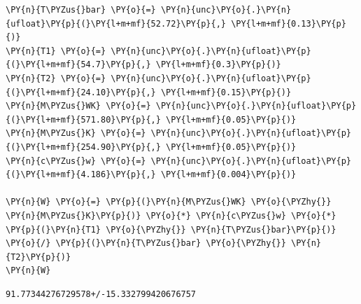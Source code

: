     \begin{tcolorbox}[breakable, size=fbox, boxrule=1pt, pad at break*=1mm,colback=cellbackground, colframe=cellborder]
\begin{Verbatim}[commandchars=\\\{\}]
\PY{n}{T\PYZus{}bar} \PY{o}{=} \PY{n}{unc}\PY{o}{.}\PY{n}{ufloat}\PY{p}{(}\PY{l+m+mf}{52.72}\PY{p}{,} \PY{l+m+mf}{0.13}\PY{p}{)}
\PY{n}{T1} \PY{o}{=} \PY{n}{unc}\PY{o}{.}\PY{n}{ufloat}\PY{p}{(}\PY{l+m+mf}{54.7}\PY{p}{,} \PY{l+m+mf}{0.3}\PY{p}{)}
\PY{n}{T2} \PY{o}{=} \PY{n}{unc}\PY{o}{.}\PY{n}{ufloat}\PY{p}{(}\PY{l+m+mf}{24.10}\PY{p}{,} \PY{l+m+mf}{0.15}\PY{p}{)}
\PY{n}{M\PYZus{}WK} \PY{o}{=} \PY{n}{unc}\PY{o}{.}\PY{n}{ufloat}\PY{p}{(}\PY{l+m+mf}{571.80}\PY{p}{,} \PY{l+m+mf}{0.05}\PY{p}{)}
\PY{n}{M\PYZus{}K} \PY{o}{=} \PY{n}{unc}\PY{o}{.}\PY{n}{ufloat}\PY{p}{(}\PY{l+m+mf}{254.90}\PY{p}{,} \PY{l+m+mf}{0.05}\PY{p}{)}
\PY{n}{c\PYZus{}w} \PY{o}{=} \PY{n}{unc}\PY{o}{.}\PY{n}{ufloat}\PY{p}{(}\PY{l+m+mf}{4.186}\PY{p}{,} \PY{l+m+mf}{0.004}\PY{p}{)}

\PY{n}{W} \PY{o}{=} \PY{p}{(}\PY{n}{M\PYZus{}WK} \PY{o}{\PYZhy{}} \PY{n}{M\PYZus{}K}\PY{p}{)} \PY{o}{*} \PY{n}{c\PYZus{}w} \PY{o}{*} \PY{p}{(}\PY{n}{T1} \PY{o}{\PYZhy{}} \PY{n}{T\PYZus{}bar}\PY{p}{)} \PY{o}{/} \PY{p}{(}\PY{n}{T\PYZus{}bar} \PY{o}{\PYZhy{}} \PY{n}{T2}\PY{p}{)}
\PY{n}{W}
\end{Verbatim}
\end{tcolorbox}

            \begin{tcolorbox}[breakable, size=fbox, boxrule=.5pt, pad at break*=1mm, opacityfill=0]
\begin{Verbatim}[commandchars=\\\{\}]
91.77344276729578+/-15.332799420676757
\end{Verbatim}
\end{tcolorbox}
        
